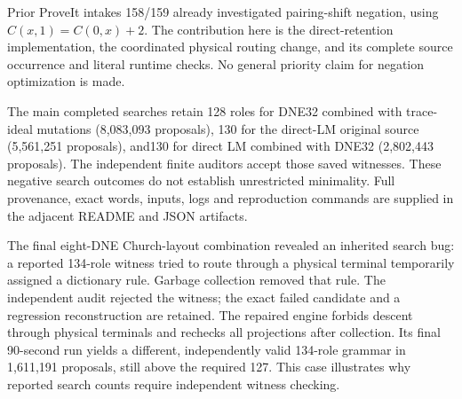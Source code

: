 Prior ProveIt intakes 158/159 already investigated pairing-shift negation,
using $C(x,1)=C(0,x)+2$. The contribution here is the direct-retention
implementation, the coordinated physical routing change, and its complete
source occurrence and literal runtime checks. No general priority claim for
negation optimization is made.

The main completed searches retain 128 roles for DNE32 combined with trace-ideal
mutations (8,083,093 proposals), 130 for the direct-LM original source
(5,561,251 proposals), and130 for direct LM combined with DNE32
(2,802,443 proposals). The independent finite auditors accept those saved
witnesses. These negative search outcomes do not establish unrestricted
minimality. Full provenance, exact words, inputs, logs and reproduction
commands are supplied in the adjacent README and JSON artifacts.

The final eight-DNE Church-layout combination revealed an inherited search
bug: a reported 134-role witness tried to route through a physical terminal
temporarily assigned a dictionary rule. Garbage collection removed that rule.
The independent audit rejected the witness; the exact failed candidate and a
regression reconstruction are retained. The repaired engine forbids descent
through physical terminals and rechecks all projections after collection.
Its final 90-second run yields a different, independently valid 134-role
grammar in 1,611,191 proposals, still above the required 127. This case
illustrates why reported search counts require independent witness checking.
